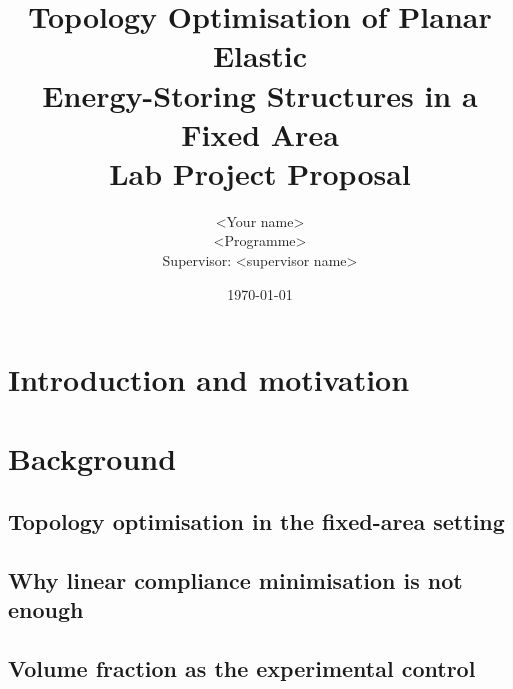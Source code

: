 \documentclass[11pt,a4paper]{article}
\title{
  \sffamily\bfseries\large
  Topology Optimisation of Planar Elastic \\
  Energy-Storing Structures in a Fixed Area
  \vspace{0.3em}\\
  \normalfont\mdseries\normalsize Lab Project Proposal
}
\author{
  \normalsize
  <Your name>\\
  \footnotesize <Student ID> \quad <Programme>\\
  \footnotesize Supervisor: <supervisor name>
}
\date{\footnotesize\today}
\theoremstyle{claim}
\begin{document}

\maketitle
\thispagestyle{empty}

\begin{abstract}
  \noindent
\end{abstract}

\vspace{1em}

\section{Introduction and motivation}

\section{Background}

\subsection{Topology optimisation in the fixed-area setting}

\subsection{Why linear compliance minimisation is not enough}

\subsection{Volume fraction as the experimental control}
\end{document}
